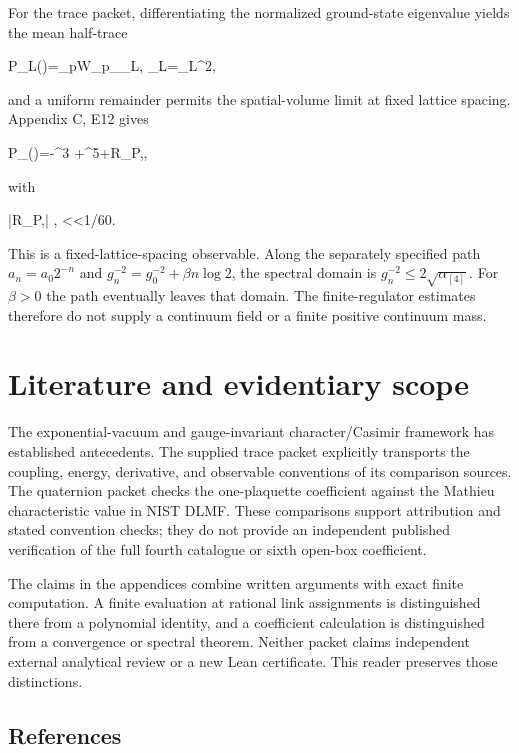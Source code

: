 \documentclass[11pt,a4paper]{article}
\let\originalsection\section
\renewcommand{\section}{\clearpage\originalsection}
\renewcommand{\[}{\begingroup\small\originaldisplaystart}
\renewcommand{\]}{\originaldisplayend\endgroup}
\begin{document}
For the trace packet, differentiating the normalized ground-state
eigenvalue yields the mean half-trace

\[P_L(\xi)=\sum_p\langle W_p\rangle_{\rho_L},
\qquad \rho_L=\psi_L^2,\]

and a uniform remainder permits the spatial-volume limit at fixed
lattice spacing. Appendix C, E12 gives

\[P_\infty(\xi)=\frac{}-\xi^3
+\xi^5+R_{P,\infty},\]

with

\[|R_{P,\infty}|\leq{}
,
<\xi<1/60.\]

This is a fixed-lattice-spacing observable. Along the separately
specified path \(a_n=a_0 2^{-n}\) and
\(g_n^{-2}=g_0^{-2}+\beta n\log2\), the spectral domain is
\(g_n^{-2}\leq2\sqrt{\alpha_{[4]}}\). For \(\beta>0\) the path
eventually leaves that domain. The finite-regulator estimates therefore
do not supply a continuum field or a finite positive continuum mass.

\section{Literature and evidentiary
scope}\label{literature-and-evidentiary-scope}

The exponential-vacuum and gauge-invariant character/Casimir framework
has established antecedents. The supplied trace packet explicitly
transports the coupling, energy, derivative, and observable conventions
of its comparison sources. The quaternion packet checks the
one-plaquette coefficient against the Mathieu characteristic value in
NIST DLMF. These comparisons support attribution and stated convention
checks; they do not provide an independent published verification of the
full fourth catalogue or sixth open-box coefficient.

The claims in the appendices combine written arguments with exact finite
computation. A finite evaluation at rational link assignments is
distinguished there from a polynomial identity, and a coefficient
calculation is distinguished from a convergence or spectral theorem.
Neither packet claims independent external analytical review or a new
Lean certificate. This reader preserves those distinctions.

\subsection{References}\label{references}
\end{document}
